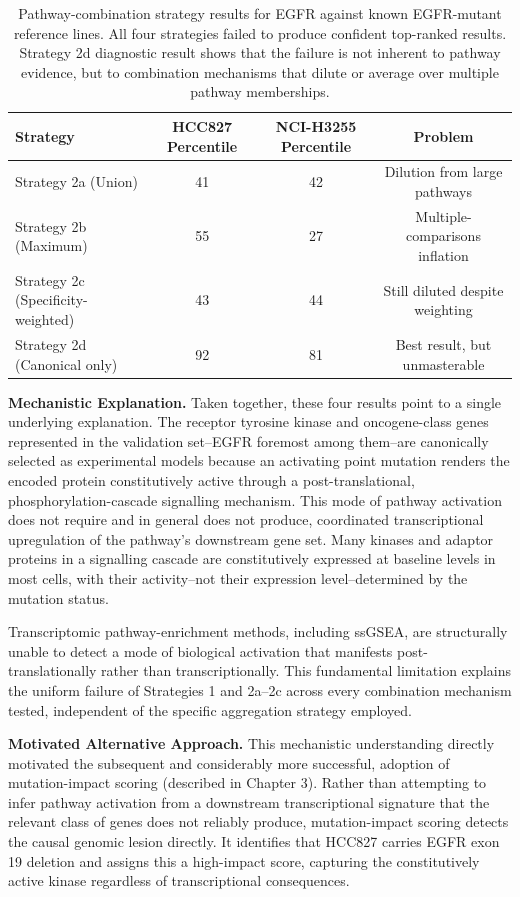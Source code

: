 \documentclass[author={Karen Coutinho, Ishaan Bhalla, Aman Raj, Dixit Kaloorani Malarmannan},
                supervisor={Dr. Daniel D'Andrea},
                degree={MSc},
                title={CellSelector Omics: A Multi-Omics Recommendation System for Cell Line Selection},
                subtitle={},
                type={},
                year={2026}]{dissertation}
\begin{document}
\begin{table}[t]
\centering
\small
\begin{tabular}{|l|c|c|c|}
\hline
{\bf Strategy} & {\bf HCC827 Percentile} & {\bf NCI-H3255 Percentile} & {\bf Problem} \\
\hline
Strategy 2a (Union) & 41 & 42 & Dilution from large pathways \\
Strategy 2b (Maximum) & 55 & 27 & Multiple-comparisons inflation \\
Strategy 2c (Specificity-weighted) & 43 & 44 & Still diluted despite weighting \\
Strategy 2d (Canonical only) & 92 & 81 & Best result, but unmasterable \\
\hline
\end{tabular}
\caption{Pathway-combination strategy results for EGFR against known EGFR-mutant reference lines. All four strategies failed to produce confident top-ranked results. Strategy 2d diagnostic result shows that the failure is not inherent to pathway evidence, but to combination mechanisms that dilute or average over multiple pathway memberships.}
\label{tab:pathway-strategies}
\end{table}

{\bf Mechanistic Explanation.} Taken together, these four results point to a single underlying explanation. The receptor tyrosine kinase and oncogene-class genes represented in the validation set--EGFR foremost among them--are canonically selected as experimental models because an activating point mutation renders the encoded protein constitutively active through a post-translational, phosphorylation-cascade signalling mechanism. This mode of pathway activation does not require and in general does not produce, coordinated transcriptional upregulation of the pathway's downstream gene set. Many kinases and adaptor proteins in a signalling cascade are constitutively expressed at baseline levels in most cells, with their activity--not their expression level--determined by the mutation status.

Transcriptomic pathway-enrichment methods, including ssGSEA, are structurally unable to detect a mode of biological activation that manifests post-translationally rather than transcriptionally. This fundamental limitation explains the uniform failure of Strategies 1 and 2a–2c across every combination mechanism tested, independent of the specific aggregation strategy employed.

{\bf Motivated Alternative Approach.} This mechanistic understanding directly motivated the subsequent and considerably more successful, adoption of mutation-impact scoring (described in Chapter 3). Rather than attempting to infer pathway activation from a downstream transcriptional signature that the relevant class of genes does not reliably produce, mutation-impact scoring detects the causal genomic lesion directly. It identifies that HCC827 carries EGFR exon 19 deletion and assigns this a high-impact score, capturing the constitutively active kinase regardless of transcriptional consequences.
\end{document}
